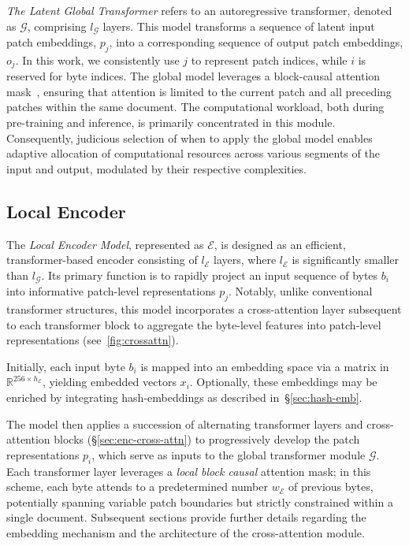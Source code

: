 \textit{The Latent Global Transformer} refers to an autoregressive transformer, denoted as $\mathcal{G}$, comprising $l_{\mathcal{G}}$ layers. This model transforms a sequence of latent input patch embeddings, $p_j$, into a corresponding sequence of output patch embeddings, $o_j$. In this work, we consistently use $j$ to represent patch indices, while $i$ is reserved for byte indices. The global model leverages a block-causal attention mask~\citep{dubey2024llama}, ensuring that attention is limited to the current patch and all preceding patches within the same document. The computational workload, both during pre-training and inference, is primarily concentrated in this module. Consequently, judicious selection of when to apply the global model enables adaptive allocation of computational resources across various segments of the input and output, modulated by their respective complexities.

\subsection{Local Encoder}
\label{section:local}

The \textit{Local Encoder Model}, represented as $\mathcal{E}$, is designed as an efficient, transformer-based encoder consisting of $l_{\mathcal{E}}$ layers, where $l_{\mathcal{E}}$ is significantly smaller than $l_{\mathcal{G}}$. Its primary function is to rapidly project an input sequence of bytes $b_i$ into informative patch-level representations $p_j$. Notably, unlike conventional transformer structures, this model incorporates a cross-attention layer subsequent to each transformer block to aggregate the byte-level features into patch-level representations (see~\autoref{fig:crossattn}).

Initially, each input byte $b_i$ is mapped into an embedding space via a matrix in $\mathbb{R}^{256 \times h_{\mathcal{E}}}$, yielding embedded vectors $x_i$. Optionally, these embeddings may be enriched by integrating hash-embeddings as described in~\S\ref{sec:hash-emb}. 

The model then applies a succession of alternating transformer layers and cross-attention blocks (\S\ref{sec:enc-cross-attn}) to progressively develop the patch representations $p_i$, which serve as inputs to the global transformer module $\mathcal{G}$. Each transformer layer leverages a \textit{local block causal} attention mask; in this scheme, each byte attends to a predetermined number $w_{\mathcal{E}}$ of previous bytes, potentially spanning variable patch boundaries but strictly constrained within a single document. Subsequent sections provide further details regarding the embedding mechanism and the architecture of the cross-attention module.

